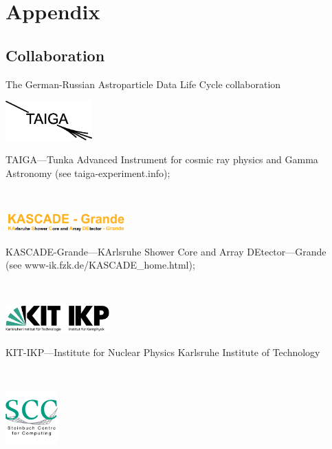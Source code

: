 
\section{Appendix}
\subsection{Collaboration}
\begin{frame}[allowframebreaks]
{The German-Russian Astroparticle Data Life Cycle collaboration}
\parbox{0.35\textwidth}{
  \centering\includegraphics[width=0.25\textwidth]{pics/taiga.eps}
}\hfill
\parbox{0.60\textwidth}{
  TAIGA---Tunka Advanced Instrument for cosmic ray physics and Gamma Astronomy (see
  taiga-experiment.info);
}
\\\vspace{1em}
\parbox{0.35\textwidth}{
  \centering\includegraphics[width=0.35\textwidth]{pics/grande.pdf}
}\hfill
\parbox{0.60\textwidth}{
  KASCADE-Grande---KArlsruhe Shower Core and Array DEtector---Grande\\ (see
  www-ik.fzk.de/KASCADE\_home.html);
}
\\\vspace{1em}
\parbox{0.35\textwidth}{
  \centering\includegraphics[width=0.30\textwidth]{pics/Logo_KIT_IKP.pdf}
}\hfill
\parbox{0.60\textwidth}{
  KIT-IKP---Institute for Nuclear Physics Karlsruhe Institute of Technology
}
\\\vspace{1em}
\parbox{0.35\textwidth}{
  \centering\includegraphics[width=0.15\textwidth]{pics/SCC-Logo.png}
}\hfill
\parbox{0.60\textwidth}{
}
\end{frame}
